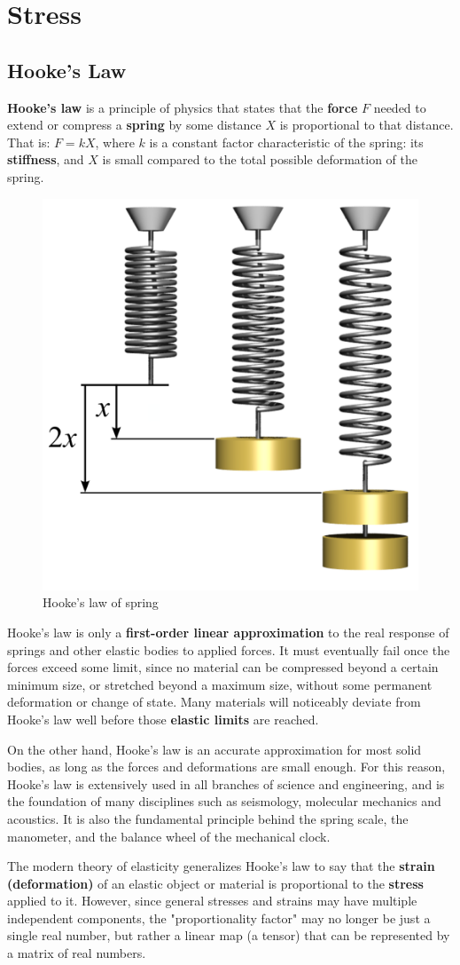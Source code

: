 
\chapter{Stress}
\section{Hooke's Law}
\textbf{Hooke's law} is a principle of physics that states that the \textbf{force} $ F $ needed to extend or compress a \textbf{spring} by some distance $ X $ is proportional to that distance. That is: $ F = kX $, where $ k $ is a constant factor characteristic of the spring: its \textbf{stiffness}, and $ X $ is small compared to the total possible deformation of the spring.

\begin{figure}[h]
\centering
\includegraphics[width=0.3\linewidth]{figure/Hookes-law-springs}
\caption{Hooke's law of spring}
\label{fig:Hookes-law-springs}
\end{figure}

Hooke's law is only a \textbf{first-order linear approximation} to the real response of springs and other elastic bodies to applied forces. It must eventually fail once the forces exceed some limit, since no material can be compressed beyond a certain minimum size, or stretched beyond a maximum size, without some permanent deformation or change of state. Many materials will noticeably deviate from Hooke's law well before those \textbf{elastic limits} are reached.

On the other hand, Hooke's law is an accurate approximation for most solid bodies, as long as the forces and deformations are small enough. For this reason, Hooke's law is extensively used in all branches of science and engineering, and is the foundation of many disciplines such as seismology, molecular mechanics and acoustics. It is also the fundamental principle behind the spring scale, the manometer, and the balance wheel of the mechanical clock.

The modern theory of elasticity generalizes Hooke's law to say that the \textbf{strain (deformation)} of an elastic object or material is proportional to the \textbf{stress} applied to it. However, since general stresses and strains may have multiple independent components, the "proportionality factor" may no longer be just a single real number, but rather a linear map (a tensor) that can be represented by a matrix of real numbers.

